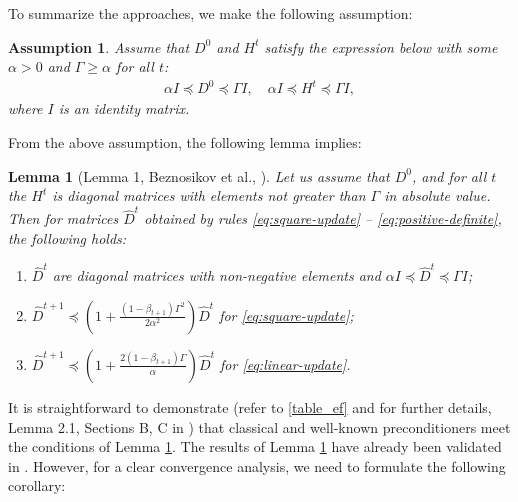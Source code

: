 \documentclass[sn-mathphys,Numbered]{sn-jnl}%
\newtheorem{assumption}{Assumption}
\newtheorem{lemma}{Lemma}%
\renewcommand{\|}{\parallel}
\renewcommand {\*} {\ast}
\begin{document}
To summarize the approaches, we make the following assumption:
\begin{assumption}
    \label{asm: preconditioner property}
    Assume that $D^{0}$ and $H^t$  
    satisfy the expression below with some
     $\alpha > 0$ and $\Gamma \geq \alpha$ for all $t$:
    \begin{align*}
        \alpha I \preceq D^{0} \preceq \Gamma I, \quad
        \alpha I \preceq H^{t} \preceq \Gamma I,
    \end{align*}
    where $I$ is an identity matrix.
\end{assumption}
From the above assumption, the following lemma implies:
\begin{lemma}[Lemma 1, Beznosikov et al., \cite{beznosikov2022scaled}]
\label{lemma: from-spp}
    Let us assume that $D^0$, and for all $t$ the $H^t$ is diagonal matrices with elements not greater than $\Gamma$ in absolute value. Then for matrices $\hat D^t$ obtained by rules \eqref{eq:square-update} -- \eqref{eq:positive-definite}, the following holds:
\begin{enumerate}
    \item 
$\hat D^t$ are diagonal matrices with non-negative elements and $\alpha I \preceq \hat{D}^{t} \preceq \Gamma I$;

    \item 
 $\hat{D}^{t+1} \preceq \left(1 + \frac{(1-\beta_{t+1})\Gamma^2 }{2\alpha^2}\right) \hat{D}^{t}$ for \eqref{eq:square-update};

    \item 
 $\hat{D}^{t+1} \preceq \left(1 + \frac{2(1-\beta_{t+1})\Gamma }{\alpha}\right) \hat{D}^{t}$ for  \eqref{eq:linear-update}.
\end{enumerate}
\end{lemma}
It is straightforward to demonstrate (refer to \cref{table_ef} and for further details, Lemma 2.1, Sections B, C in \cite{sadiev2022stochastic}) that classical and well-known preconditioners meet the conditions of Lemma \cref{lemma: from-spp}. The results of Lemma \cref{lemma: from-spp} have already been validated in \cite{beznosikov2022scaled}. However, for a clear convergence analysis, we need to formulate the following corollary:
\end{document}
